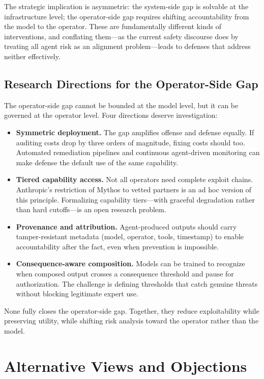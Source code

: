 \documentclass{article}
\begin{document}
The strategic implication is asymmetric: the system-side gap is solvable at the infrastructure level; the operator-side gap requires shifting accountability from the model to the operator. These are fundamentally different kinds of interventions, and conflating them---as the current safety discourse does by treating all agent risk as an alignment problem---leads to defenses that address neither effectively.

\subsection{Research Directions for the Operator-Side Gap}

The operator-side gap cannot be bounded at the model level, but it can be governed at the operator level. Four directions deserve investigation:

\begin{itemize}[nosep,leftmargin=*]
\item \textbf{Symmetric deployment.} The gap amplifies offense and defense equally. If auditing costs drop by three orders of magnitude, fixing costs should too. Automated remediation pipelines and continuous agent-driven monitoring can make defense the default use of the same capability.
\item \textbf{Tiered capability access.} Not all operators need complete exploit chains. Anthropic's restriction of Mythos to vetted partners \cite{anthropic2026mythos,anthropic2026glasswing} is an ad hoc version of this principle. Formalizing capability tiers---with graceful degradation rather than hard cutoffs---is an open research problem.
\item \textbf{Provenance and attribution.} Agent-produced outputs should carry tamper-resistant metadata (model, operator, tools, timestamp) to enable accountability after the fact, even when prevention is impossible.
\item \textbf{Consequence-aware composition.} Models can be trained to recognize when composed output crosses a consequence threshold and pause for authorization. The challenge is defining thresholds that catch genuine threats without blocking legitimate expert use.
\end{itemize}

None fully closes the operator-side gap. Together, they reduce exploitability while preserving utility, while shifting risk analysis toward the operator rather than the model.


\section{Alternative Views and Objections}
\end{document}
